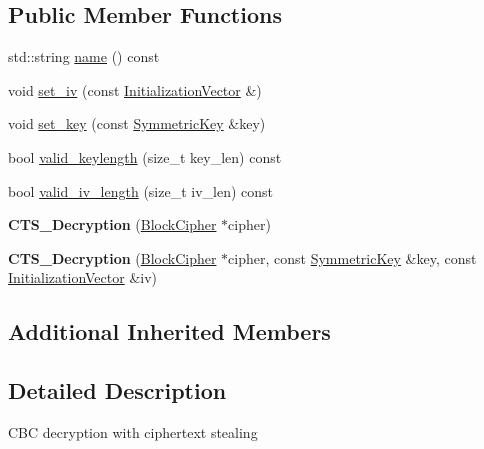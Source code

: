 \subsection*{Public Member Functions}
\begin{DoxyCompactItemize}
\item 
std\-::string \hyperlink{classBotan_1_1CTS__Decryption_a559583d7a9b6ac65216eafd962920fa5}{name} () const 
\item 
void \hyperlink{classBotan_1_1CTS__Decryption_a6255b31afa6f31f884238cce0906c371}{set\-\_\-iv} (const \hyperlink{namespaceBotan_ab6a07e859c4e3a2ccfd68308ec89497e}{Initialization\-Vector} \&)
\item 
void \hyperlink{classBotan_1_1CTS__Decryption_a143ff3c4c66c8ed11b5b7e3c5ffe5c99}{set\-\_\-key} (const \hyperlink{namespaceBotan_a00c78597211d5c63b63e2a57ddb96d38}{Symmetric\-Key} \&key)
\item 
bool \hyperlink{classBotan_1_1CTS__Decryption_adbe0dccb48e6d0f30550e1174b136d3f}{valid\-\_\-keylength} (size\-\_\-t key\-\_\-len) const 
\item 
bool \hyperlink{classBotan_1_1CTS__Decryption_a06ef3d3e3c93b0b50414e920f201766f}{valid\-\_\-iv\-\_\-length} (size\-\_\-t iv\-\_\-len) const 
\item 
\hypertarget{classBotan_1_1CTS__Decryption_a3b2e4f37f0c89d9363a0faf7e3ad66b4}{{\bfseries C\-T\-S\-\_\-\-Decryption} (\hyperlink{classBotan_1_1BlockCipher}{Block\-Cipher} $\ast$cipher)}\label{classBotan_1_1CTS__Decryption_a3b2e4f37f0c89d9363a0faf7e3ad66b4}

\item 
\hypertarget{classBotan_1_1CTS__Decryption_a73be40a035db2b8cc7c79c847f548b6a}{{\bfseries C\-T\-S\-\_\-\-Decryption} (\hyperlink{classBotan_1_1BlockCipher}{Block\-Cipher} $\ast$cipher, const \hyperlink{namespaceBotan_a00c78597211d5c63b63e2a57ddb96d38}{Symmetric\-Key} \&key, const \hyperlink{namespaceBotan_ab6a07e859c4e3a2ccfd68308ec89497e}{Initialization\-Vector} \&iv)}\label{classBotan_1_1CTS__Decryption_a73be40a035db2b8cc7c79c847f548b6a}

\end{DoxyCompactItemize}
\subsection*{Additional Inherited Members}


\subsection{Detailed Description}
C\-B\-C decryption with ciphertext stealing 

